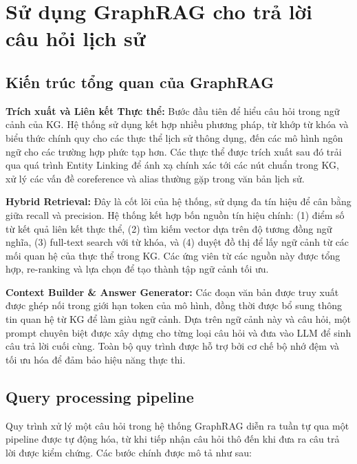\section{Sử dụng GraphRAG cho trả lời câu hỏi lịch sử}
\label{sec:graphrag}

\subsection{Kiến trúc tổng quan của GraphRAG}
\textbf{Trích xuất và Liên kết Thực thể:} Bước đầu tiên để hiểu câu hỏi trong ngữ cảnh của KG. Hệ thống sử dụng kết hợp nhiều phương pháp, từ khớp từ khóa và biểu thức chính quy cho các thực thể lịch sử thông dụng, đến các mô hình ngôn ngữ cho các trường hợp phức tạp hơn. Các thực thể được trích xuất sau đó trải qua quá trình Entity Linking để ánh xạ chính xác tới các nút chuẩn trong KG, xử lý các vấn đề coreference và alias thường gặp trong văn bản lịch sử.

\textbf{Hybrid Retrieval:} Đây là cốt lõi của hệ thống, sử dụng đa tín hiệu để cân bằng giữa recall và precision. Hệ thống kết hợp bốn nguồn tín hiệu chính: (1) điểm số từ kết quả liên kết thực thể, (2) tìm kiếm vector dựa trên độ tương đồng ngữ nghĩa, (3) full-text search với từ khóa, và (4) duyệt đồ thị để lấy ngữ cảnh từ các mối quan hệ của thực thể trong KG. Các ứng viên từ các nguồn này được tổng hợp, re-ranking và lựa chọn để tạo thành tập ngữ cảnh tối ưu.

\textbf{Context Builder \& Answer Generator:} Các đoạn văn bản được truy xuất được ghép nối trong giới hạn token của mô hình, đồng thời được bổ sung thông tin quan hệ từ KG để làm giàu ngữ cảnh. Dựa trên ngữ cảnh này và câu hỏi, một prompt chuyên biệt được xây dựng cho từng loại câu hỏi và đưa vào LLM để sinh câu trả lời cuối cùng. Toàn bộ quy trình được hỗ trợ bởi cơ chế bộ nhớ đệm và tối ưu hóa để đảm bảo hiệu năng thực thi.

\subsection{Query processing pipeline}

Quy trình xử lý một câu hỏi trong hệ thống GraphRAG diễn ra tuần tự qua một pipeline được tự động hóa, từ khi tiếp nhận câu hỏi thô đến khi đưa ra câu trả lời được kiểm chứng. Các bước chính được mô tả như sau:

